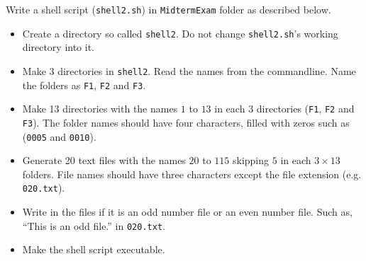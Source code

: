 \question[25]

Write a shell script (\texttt{shell2.sh}) in \texttt{MidtermExam} folder as described below.
\begin{itemize}
\item Create a directory so called \texttt{shell2}. Do not change \texttt{shell2.sh}'s working directory into it.
\item Make 3 directories in \texttt{shell2}. Read the names from the commandline. Name the folders as \texttt{F1}, \texttt{F2} and \texttt{F3}.
\item Make 13 directories with the names $1$ to $13$ in each $3$ directories (\texttt{F1}, \texttt{F2} and \texttt{F3}). The folder names should have four characters, filled with zeros such as (\texttt{0005} and \texttt{0010}). 
\item Generate 20 text files with the names $20$ to $115$ skipping $5$ in each $3\times13$ folders. File names should have three characters except the file extension (e.g. \texttt{020.txt}).
\item Write in the files if it is an odd number file or an even number file. Such as, ``This is an odd file.'' in \texttt{020.txt}.
\item Make the shell script executable.
\end{itemize}

